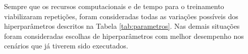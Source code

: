 %
%

Sempre que os recursos computacionais e de tempo para o treinamento viabilizaram repetições, foram consideradas todas as variações possíveis dos hiperparâmetros descritos na Tabela \ref{tab:parametros}. Nas demais situações foram consideradas escolhas de hiperparâmetros com melhor desempenho nos cenários que já tiverem sido executados. %

